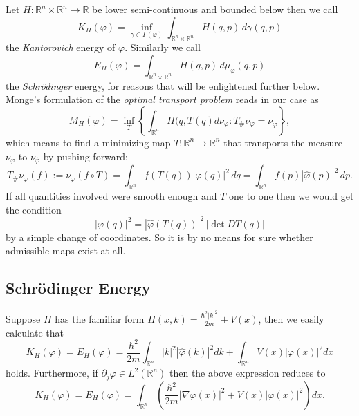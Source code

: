 \documentclass[12pt,a4paper,draft]{article}
\newcommand{\RR}[1]{\mathbb{R}^#1}
\begin{document}
Let $H:\RR{n}\times\RR{n}\longrightarrow\mathbb{R}$ be lower semi-continuous
and bounded below then we call
\begin{equation}
       K_H(\varphi) = \inf_{\gamma\in\Gamma(\varphi)} 
          \int_{\RR{n} \times \RR{n}} H(q,p) \,d\gamma(q,p)
\end{equation}\label{KantEnergy}
the {\sl Kantorovich} energy of $\varphi$. Similarly we call
\begin{equation}
      E_H(\varphi) = \int_{\RR{n} \times \RR{n}} H(q,p) \, d\mu_{\varphi}(q,p)
\end{equation}\label{SchroedEnergy}
the {\sl Schr\"odinger} energy, for reasons that will be enlightened further below. 
Monge's formulation of the {\sl optimal transport problem} reads in our case as
\begin{equation}
   M_H(\varphi)=\inf_{T} \left\{\int_{\RR n} H(q,T(q) d\nu_{\varphi} : 
       T_\# \nu_{\varphi} = \nu_{\hat\varphi} \right\},
\end{equation}
which means to find a minimizing map $T:{\RR n}\rightarrow \RR{n}$ that 
transports the measure $\nu_\varphi$ to $\nu_{\hat\varphi}$ by pushing forward:
\begin{displaymath}
     T_\# \nu_{\varphi}(f):=\nu_{\varphi}(f\circ T)=
        \int_{\RR n} f(T(q)) |\varphi(q)|^2 \,dq 
          = \int_{\RR n} f(p) |\hat\varphi(p)|^2 \,dp.
\end{displaymath}
If all quantities involved were smooth enough and $T$ one to one then we would get the condition
\begin{equation}\label{MAEQ}
     |\varphi(q)|^2 = |\hat\varphi(T(q))|^2\, |\det{DT(q)}|
\end{equation}
by a simple change of coordinates. So it is by no means for sure whether 
admissible maps exist at all. 
%
\subsection{Schrödinger Energy}
Suppose $H$ has the familiar form $H(x,k)= \frac{\hbar^2 |k|^2}{2m}+V(x)$,
then we easily calculate that 
\begin{displaymath}
     K_H(\varphi) = E_H(\varphi)=
        \frac{\hbar^2}{2m} \int_{\RR n} |k|^2 |\hat\varphi(k)|^2  dk +   
        \int_{\RR n} V(x) |\varphi(x)|^2  dx
\end{displaymath}
holds. Furthermore, if $\partial_j\varphi\in L^2(\RR n)$  
then the above expression reduces to 
\begin{equation}
          K_H(\varphi) = E_H(\varphi)= \int_{\RR n}
              \left(  \frac{\hbar^2}{2m} |\nabla\varphi(x)|^2
              + V(x) |\varphi(x)|^2 \right) dx.
\end{equation}
\end{document}
